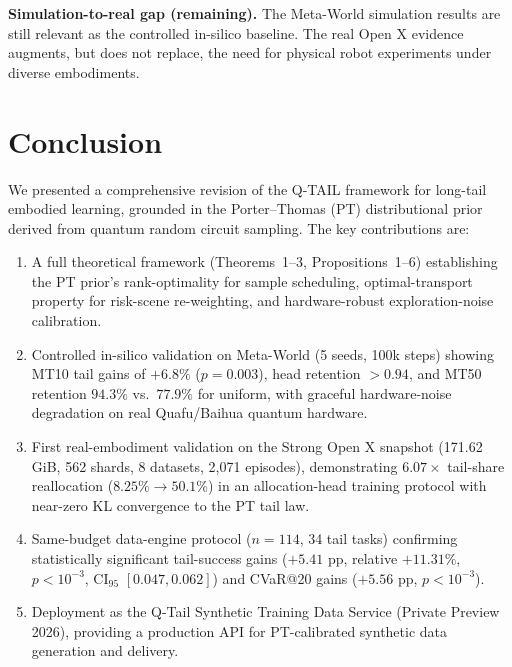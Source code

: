 \documentclass[10pt]{article}
\begin{document}
\textbf{Simulation-to-real gap (remaining).}
The Meta-World simulation results are still relevant as the controlled in-silico
baseline.  The real Open X evidence augments, but does not replace, the need for
physical robot experiments under diverse embodiments.

\section{Conclusion}
\label{sec:conclusion}

We presented a comprehensive revision of the Q-TAIL framework for long-tail embodied
learning, grounded in the Porter--Thomas (PT) distributional prior derived from quantum
random circuit sampling.  The key contributions are:

\begin{enumerate}
  \item A full theoretical framework (Theorems~1--3, Propositions~1--6) establishing
    the PT prior's rank-optimality for sample scheduling, optimal-transport property
    for risk-scene re-weighting, and hardware-robust exploration-noise calibration.
  \item Controlled in-silico validation on Meta-World (5 seeds, 100k steps) showing
    MT10 tail gains of $+6.8\%$ ($p=0.003$), head retention $>0.94$, and MT50 retention
    $94.3\%$ vs.\ $77.9\%$ for uniform, with graceful hardware-noise degradation on
    real Quafu/Baihua quantum hardware.
  \item First real-embodiment validation on the Strong Open X snapshot (171.62 GiB,
    562 shards, 8 datasets, 2,071 episodes), demonstrating $6.07\times$ tail-share
    reallocation ($8.25\%\to50.1\%$) in an allocation-head training protocol with
    near-zero KL convergence to the PT tail law.
  \item Same-budget data-engine protocol ($n=114$, 34 tail tasks) confirming
    statistically significant tail-success gains ($+5.41$ pp, relative $+11.31\%$,
    $p<10^{-3}$, CI$_{95}$ $[0.047,0.062]$) and CVaR@20 gains ($+5.56$ pp,
    $p<10^{-3}$).
  \item Deployment as the Q-Tail Synthetic Training Data Service (Private Preview 2026),
    providing a production API for PT-calibrated synthetic data generation and delivery.
\end{enumerate}
\end{document}
